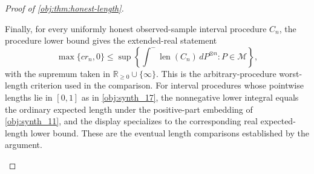 \begin{proof}[Proof of \cref{obj:thm:honest-length}]
\begin{enumerate}
Finally, for every uniformly honest observed-sample interval procedure \(C_n\), the procedure lower
bound gives the extended-real statement
\[
\max\{c r_n,0\}
\le
\sup\left\{
\int^{-}\operatorname{len}(C_n)\,dP^{\otimes n}: P\in\mathcal M
\right\},
\]
with the supremum taken in \(\mathbb R_{\ge0}\cup\{\infty\}\). This is the arbitrary-procedure worst-length criterion used in the comparison. For interval procedures whose pointwise lengths lie in \([0,1]\) as in \cref{obj:synth_17}, the nonnegative lower integral equals the ordinary expected length under the positive-part embedding of \cref{obj:synth_11}, and the display specializes to the corresponding real expected-length lower bound.
These are the eventual length comparisons established by the argument.
\end{enumerate}
\end{proof}

